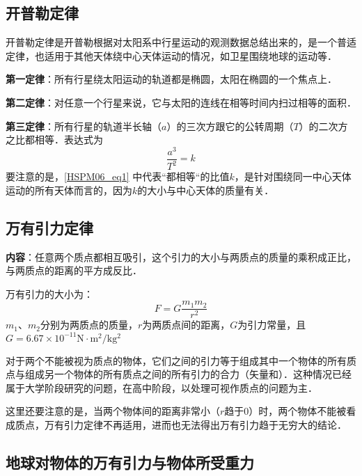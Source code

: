 
\begin{issues}
\issueDraft
\issueTODO
\end{issues}

\subsection{开普勒定律}

开普勒定律是开普勒根据对太阳系中行星运动的观测数据总结出来的，是一个普适定律，也适用于其他天体绕中心天体运动的情况，如卫星围绕地球的运动等．

\textbf{第一定律}：所有行星绕太阳运动的轨道都是椭圆，太阳在椭圆的一个焦点上．

\textbf{第二定律}：对任意一个行星来说，它与太阳的连线在相等时间内扫过相等的面积．

\textbf{第三定律}：所有行星的轨道半长轴（$a$）的三次方跟它的公转周期（$T$）的二次方之比都相等．表达式为
\begin{equation}\label{HSPM06_eq1}
\frac{a^3}{T^2}=k
\end{equation}
要注意的是，\autoref{HSPM06_eq1} 中代表“都相等“的比值$k$，是针对围绕同一中心天体运动的所有天体而言的，因为$k$的大小与中心天体的质量有关．

\subsection{万有引力定律}

\textbf{内容}：任意两个质点都相互吸引，这个引力的大小与两质点的质量的乘积成正比，与两质点的距离的平方成反比．

万有引力的大小为：
\begin{equation}
F=G\frac{m_1m_2}{r^2}
\end{equation}
$m_1$、$m_2$分别为两质点的质量，$r$为两质点间的距离，$G$为引力常量，且$G=6.67\times 10^{-11}\mathrm{N\cdot m^2/kg^2}$

对于两个不能被视为质点的物体，它们之间的引力等于组成其中一个物体的所有质点与组成另一个物体的所有质点之间的所有引力的合力（矢量和）．这种情况已经属于大学阶段研究的问题，在高中阶段，以处理可视作质点的问题为主．

这里还要注意的是，当两个物体间的距离非常小（$r$趋于$0$）时，两个物体不能被看成质点，万有引力定律不再适用，进而也无法得出万有引力趋于无穷大的结论．

\subsection{地球对物体的万有引力与物体所受重力}

